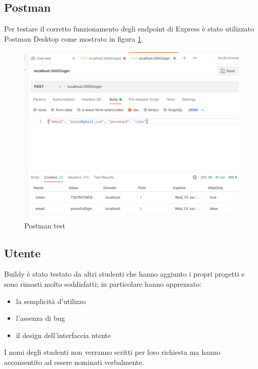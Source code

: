 \documentclass{report}
\begin{document}
\subsection{Postman}
Per testare il corretto funzionamento degli endpoint di Express è stato utilizzato Postman Desktop come mostrato in figura \ref{fig:postman}.
\begin{figure}[h!]
\centering
\includegraphics[scale=0.44]{postman.png}
\caption{Postman test}
\label{fig:postman}
\end{figure}
\subsection{Utente}
Buildy è stato testato da altri studenti che hanno aggiunto i propri progetti e sono rimasti molto soddisfatti; in particolare hanno apprezzato:
\begin{itemize}
\item la semplicità d'utilizzo
\item l'assenza di bug
\item il design dell'interfaccia utente
\end{itemize}
I nomi degli studenti non verranno scritti per loro richiesta ma hanno acconsentito ad essere nominati verbalmente.
\end{document}
